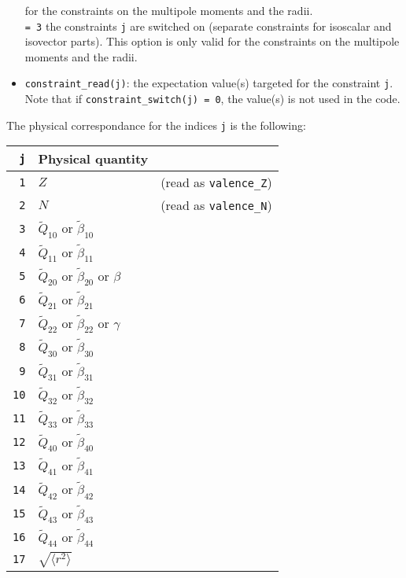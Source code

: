 \documentclass[a4paper,11pt]{article}
\newcommand{\ttt}[1]{\texttt{#1}}
\begin{document}
\begin{itemize}
  for the constraints on the multipole moments and the radii. \\[0.05cm]
  \ttt{= 3\:} the constraints \ttt{j} are switched on (separate constraints for isoscalar and isovector parts). This option is only valid 
  for the constraints on the multipole moments and the radii. \\[0.05cm]
\item \ttt{constraint\_read(j)}: the expectation value(s) targeted for the constraint \ttt{j}. \\
      Note that if \ttt{constraint\_switch(j) = 0}, the value(s) is not used in the code.
\end{itemize}

The physical correspondance for the indices \ttt{j} is the following:
\begin{center}
\begin{tabular}{|r|ll|}
\hline
 \ttt{j} & Physical quantity &\\
\hline
 \ttt{ 1} & $Z$ &(read as \ttt{valence\_Z}) \\
 \ttt{ 2} & $N$ &(read as \ttt{valence\_N}) \\
 \ttt{ 3} & $\tilde{Q}_{10}$ or $\tilde{\beta}_{10}$ &\\
 \ttt{ 4} & $\tilde{Q}_{11}$ or $\tilde{\beta}_{11}$ &\\
 \ttt{ 5} & $\tilde{Q}_{20}$ or $\tilde{\beta}_{20}$ or $\beta$ &\\
 \ttt{ 6} & $\tilde{Q}_{21}$ or $\tilde{\beta}_{21}$ &\\
 \ttt{ 7} & $\tilde{Q}_{22}$ or $\tilde{\beta}_{22}$ or $\gamma$ &\\
 \ttt{ 8} & $\tilde{Q}_{30}$ or $\tilde{\beta}_{30}$ &\\
 \ttt{ 9} & $\tilde{Q}_{31}$ or $\tilde{\beta}_{31}$ &\\
 \ttt{10} & $\tilde{Q}_{32}$ or $\tilde{\beta}_{32}$ &\\
 \ttt{11} & $\tilde{Q}_{33}$ or $\tilde{\beta}_{33}$ &\\
 \ttt{12} & $\tilde{Q}_{40}$ or $\tilde{\beta}_{40}$ &\\
 \ttt{13} & $\tilde{Q}_{41}$ or $\tilde{\beta}_{41}$ &\\
 \ttt{14} & $\tilde{Q}_{42}$ or $\tilde{\beta}_{42}$ &\\
 \ttt{15} & $\tilde{Q}_{43}$ or $\tilde{\beta}_{43}$ &\\
 \ttt{16} & $\tilde{Q}_{44}$ or $\tilde{\beta}_{44}$ &\\
 \ttt{17} & $\sqrt{\langle r^2 \rangle}$ \\

\end{tabular}
\end{center}
\end{document}
